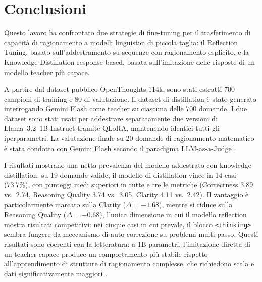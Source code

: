 \chapter{Conclusioni}
\label{cap:5}

Questo lavoro ha confrontato due strategie di fine-tuning per il
trasferimento di capacità di ragionamento a modelli linguistici di
piccola taglia: il Reflection Tuning, basato sull'addestramento su
sequenze con ragionamento esplicito, e la Knowledge Distillation
response-based, basata sull'imitazione delle risposte di un modello
teacher più capace.

A partire dal dataset pubblico OpenThoughts-114k, sono stati estratti
700 campioni di training e 80 di valutazione. Il dataset di
distillation è stato generato interrogando Gemini Flash come teacher
su ciascuna delle 700 domande. I due dataset sono stati usati per
addestrare separatamente due versioni di Llama~3.2~1B-Instruct tramite
QLoRA, mantenendo identici tutti gli iperparametri. La valutazione
finale su 20 domande di ragionamento matematico è stata condotta con
Gemini Flash secondo il paradigma LLM-as-a-Judge \cite{zheng2023judging}.

I risultati mostrano una netta prevalenza del modello addestrato con
knowledge distillation: su 19 domande valide, il modello di
distillation vince in 14 casi (73.7\%), con punteggi medi superiori
in tutte e tre le metriche (Correctness 3.89 vs.\ 2.74, Reasoning
Quality 3.74 vs.\ 3.05, Clarity 4.11 vs.\ 2.42). Il vantaggio è
particolarmente marcato sulla Clarity ($\Delta = -1.68$), mentre si
riduce sulla Reasoning Quality ($\Delta = -0.68$), l'unica dimensione
in cui il modello reflection mostra risultati competitivi: nei cinque
casi in cui prevale, il blocco \texttt{<thinking>} sembra fungere da
meccanismo di auto-correzione su problemi multi-passo. Questi risultati
sono coerenti con la letteratura: a 1B parametri, l'imitazione diretta
di un teacher capace produce un comportamento più stabile rispetto
all'apprendimento di strutture di ragionamento complesse, che richiedono
scala e dati significativamente maggiori \cite{taori2023alpaca,wei2022chain}.

